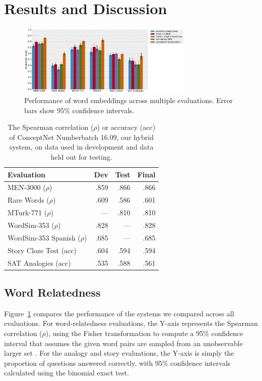 \documentclass[letterpaper]{article}
\begin{document}
\section{Results and Discussion}
\begin{figure}[t]
\centering
\includegraphics[width=3.3in]{eval-graph.pdf}
\caption{
    Performance of word embeddings across multiple evaluations.
    Error bars show 95\% confidence intervals.
}
\label{eval-results}
\end{figure}

\begin{table}[t]
\centering
\begin{tabular}{lrrr}
\bf Evaluation     & \bf Dev & \bf Test & \bf Final \\
\hline
MEN-3000 ($\rho$)              & .859 & .866 & .866 \\
Rare Words ($\rho$)            & .609 & .586 & .601 \\
MTurk-771 ($\rho$)             &  --- & .810 & .810 \\
WordSim-353 ($\rho$)           & .828 &  --- & .828 \\
WordSim-353 Spanish ($\rho$)   & .685 &  --- & .685 \\
Story Cloze Test (acc)         & .604 & .594 & .594 \\
SAT Analogies (acc)            & .535 & .588 & .561
\end{tabular}
\caption{The Spearman correlation ($\rho$) or accuracy (acc) of ConceptNet Numberbatch 16.09, our hybrid system,
on data used in development and data held out for testing.}
\label{eval-table}
\end{table}

\subsection{Word Relatedness}

Figure~\ref{eval-results} compares the performance of the systems we compared
across all evaluations. For word-relatedness evaluations, the Y-axis represents
the Spearman correlation ($\rho$), using the Fisher transformation to compute a
95\% confidence interval that assumes the given word pairs are sampled from an
unobservable larger set \cite{bonett2000sample}. For the analogy and story evaluations,
the Y-axis is simply the proportion of questions answered correctly, with 95\%
confidence intervals calculated using the binomial exact test.
\end{document}
